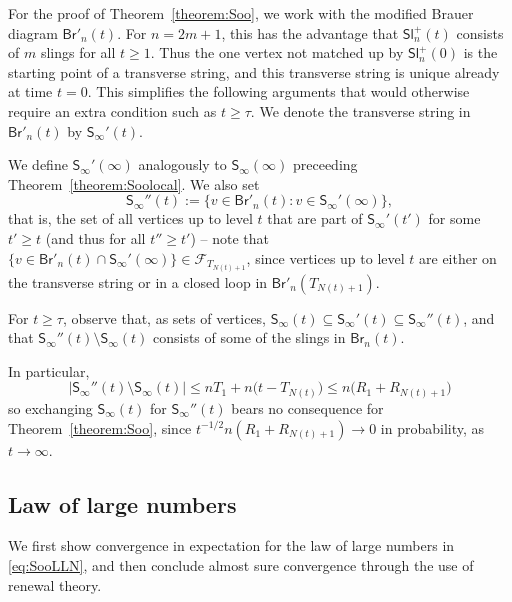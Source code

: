 \documentclass[a4paper,11pt,reqno]{amsart}
\newcommand{\paul}[1]{\todo[color=yellow!70,inline]{Paul: #1}}
\newcommand{\fabian}[1]{\todo[color=red!50,inline]{Fabian: #1}}
\newcommand{\Br}{\mathsf{Br}}
\newcommand{\Slr}{\mathsf{Sl}^+}
\newcommand{\Soo}{\mathsf{S}_\infty}
\newcommand{\F}{\mathscr{F}}
\newcommand{\ssq}{\subseteq}
\theoremstyle{definition}
\begin{document}
For the proof of Theorem~\ref{theorem:Soo}, we work with the modified Brauer diagram $\Br'_n(t)$. For $n=2m+1$, this has the advantage that $\Slr_n(t)$ consists of $m$ slings for all $t\geq 1$. Thus the one vertex not matched up by $\Slr_n(0)$ is the starting point of a transverse string, and this transverse string is unique already at time $t=0$. This simplifies the following arguments that would otherwise require an extra condition such as $t\geq \tau$. We denote the transverse string in $\Br'_n(t)$ by $\Soo'(t)$.

We define $\Soo'(\infty)$ analogously to $\Soo(\infty)$ preceeding Theorem~\ref{theorem:Soolocal}. We also set 
\[
 \Soo''(t):=\{v\in\Br'_n(t): v\in\Soo'(\infty)\}, 
\]
that is, the set of all vertices up to level $t$ that are part of $\Soo'(t')$ for some $t'\geq t$ (and thus for all $t''\geq t'$) -- note that $\{v\in\Br'_n(t)\cap \Soo'(\infty)\}\in \F_{T_{N(t)+1}}$, since vertices up to level $t$ are either on the transverse string or in a closed loop in $\Br'_n(T_{N(t)+1})$. 

For $t \geq \tau$, observe that, as sets of vertices, $\Soo(t)\ssq \Soo'(t)\ssq \Soo''(t)$, and that $\Soo''(t)\setminus\Soo(t)$ consists of some of the slings in $\Br_n(t)$. 


In particular, 
\[
 |\Soo''(t)\setminus\Soo(t)|\leq nT_1 + n\big(t-T_{N(t)}\big)\leq n\big(R_1 + R_{N(t)+1}\big)
\]
so exchanging $\Soo(t)$ for $\Soo''(t)$ bears no consequence for Theorem~\ref{theorem:Soo}, since $t^{-1/2}n(R_1+R_{N(t)+1}) \to 0$ in probability, as $t\to\infty$. 

\subsection*{Law of large numbers} 
We first show convergence in expectation for the law of large numbers in \eqref{eq:SooLLN}, and then conclude almost sure convergence through the use of renewal theory. 

\end{document}
